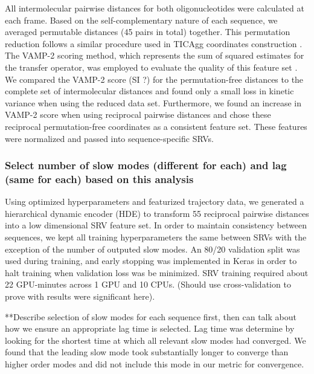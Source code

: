 \documentclass[journal=jpcbfk,manuscript=article]{achemso}
\begin{document}
All intermolecular pairwise distances for both oligonucleotides were calculated at each frame. Based on the self-complementary nature of each sequence, we averaged permutable distances (45 pairs in total) together. This permutation reduction follows a similar procedure used in TICAgg coordinates construction \citep{Sengupta2019AutomatedSelf-assembly}. The VAMP-2 scoring method, which represents the sum of squared estimates for the transfer operator, was employed to evaluate the quality of this feature set \citep{Mardt2018VAMPnetsKinetics}. We compared the VAMP-2 score (SI ?) for the permutation-free distances to the complete set of intermolecular distances and found only a small loss in kinetic variance when using the reduced data set. Furthermore, we found an increase in VAMP-2 score when using reciprocal pairwise distances and chose these reciprocal permutation-free coordinates as a consistent feature set. These features were normalized and passed into sequence-specific SRVs. 

\subsubsection{\label{sec:methods}Select number of slow modes (different for each) and lag (same for each) based on this analysis}

Using optimized hyperparameters and featurized trajectory data, we generated a hierarchical dynamic encoder (HDE) to transform 55 reciprocal pairwise distances into a low dimensional SRV feature set. In order to maintain consistency between sequences, we kept all training hyperparameters the same between SRVs with the exception of the number of outputed slow modes. An 80/20 validation split was used during training, and early stopping was implemented in Keras in order to halt training when validation loss was be minimized. SRV training required about 22 GPU-minutes across 1 GPU and 10 CPUs. (Should use cross-validation to prove with results were significant here).

**Describe selection of slow modes for each sequence first, then can talk about how we ensure an appropriate lag time is selected. Lag time was determine by looking for the shortest time at which all relevant slow modes had converged. We found that the leading slow mode took substantially longer to converge than higher order modes and did not include this mode in our metric for convergence.
\end{document}
